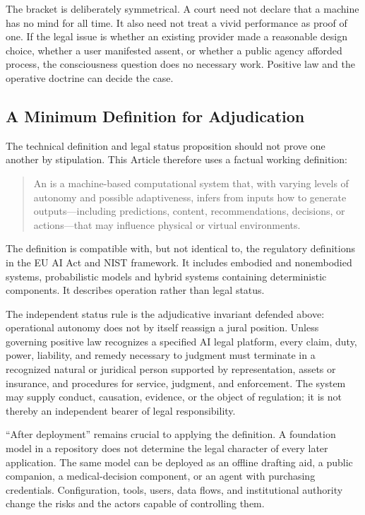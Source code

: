 The bracket is deliberately symmetrical. A court need not declare that a machine has no mind for all time. It also need not treat a vivid performance as proof of one. If the legal issue is whether an existing provider made a reasonable design choice, whether a user manifested assent, or whether a public agency afforded process, the consciousness question does no necessary work. Positive law and the operative doctrine can decide the case.

\subsection{A Minimum Definition for Adjudication}

The technical definition and legal status proposition should not prove one another by stipulation. This Article therefore uses a factual working definition:

\begin{quote}
An  is a machine-based computational system that, with varying levels of autonomy and possible adaptiveness, infers from inputs how to generate outputs---including predictions, content, recommendations, decisions, or actions---that may influence physical or virtual environments.
\end{quote}

The definition is compatible with, but not identical to, the regulatory definitions in the EU AI Act and NIST framework. It includes embodied and nonembodied systems, probabilistic models and hybrid systems containing deterministic components. It describes operation rather than legal status.

The independent status rule is the adjudicative invariant defended above: operational autonomy does not by itself reassign a jural position. Unless governing positive law recognizes a specified AI legal platform, every claim, duty, power, liability, and remedy necessary to judgment must terminate in a recognized natural or juridical person supported by representation, assets or insurance, and procedures for service, judgment, and enforcement. The system may supply conduct, causation, evidence, or the object of regulation; it is not thereby an independent bearer of legal responsibility.

``After deployment'' remains crucial to applying the definition. A foundation model in a repository does not determine the legal character of every later application. The same model can be deployed as an offline drafting aid, a public companion, a medical-decision component, or an agent with purchasing credentials. Configuration, tools, users, data flows, and institutional authority change the risks and the actors capable of controlling them.

